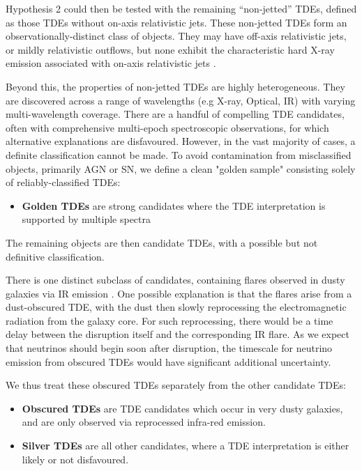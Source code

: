 Hypothesis 2 could then be tested with the remaining ``non-jetted'' TDEs, defined as those TDEs without on-axis relativistic jets. These non-jetted TDEs form an observationally-distinct class of objects. They may have off-axis relativistic jets, or mildly relativistic outflows, but none exhibit the characteristic hard X-ray emission associated with on-axis relativistic jets .

Beyond this, the properties of non-jetted TDEs are highly heterogeneous. They are discovered across a range of wavelengths (e.g X-ray, Optical, IR) with varying multi-wavelength coverage. There are a handful of compelling TDE candidates, often with comprehensive multi-epoch spectroscopic observations, for which alternative explanations are disfavoured. However, in the vast majority of cases, a definite classification cannot be made. To avoid contamination from misclassified objects, primarily AGN or SN, we define a clean "golden sample" consisting solely of reliably-classified TDEs:

\begin{itemize}
	\item \textbf{Golden TDEs} are strong candidates where the TDE interpretation is supported by multiple spectra
\end{itemize}

The remaining objects are then candidate TDEs, with a possible but not definitive classification. 

There is one distinct subclass of candidates, containing flares observed in dusty galaxies via IR emission . One possible explanation is that the flares arise from a dust-obscured TDE, with the dust then slowly reprocessing the electromagnetic radiation from the galaxy core.  For such reprocessing, there would be a time delay between the disruption itself and the corresponding IR flare. As we expect that neutrinos should begin soon after disruption, the timescale for neutrino emission from obscured TDEs would have significant additional uncertainty. 

We thus treat these obscured TDEs separately from the other candidate TDEs:

\begin{itemize}
		\item \textbf{Obscured TDEs} are TDE candidates which occur in very dusty galaxies, and are only observed via reprocessed infra-red emission. 
	\item \textbf{Silver TDEs} are all other candidates, where a TDE interpretation is either likely or not disfavoured.
\end{itemize}


